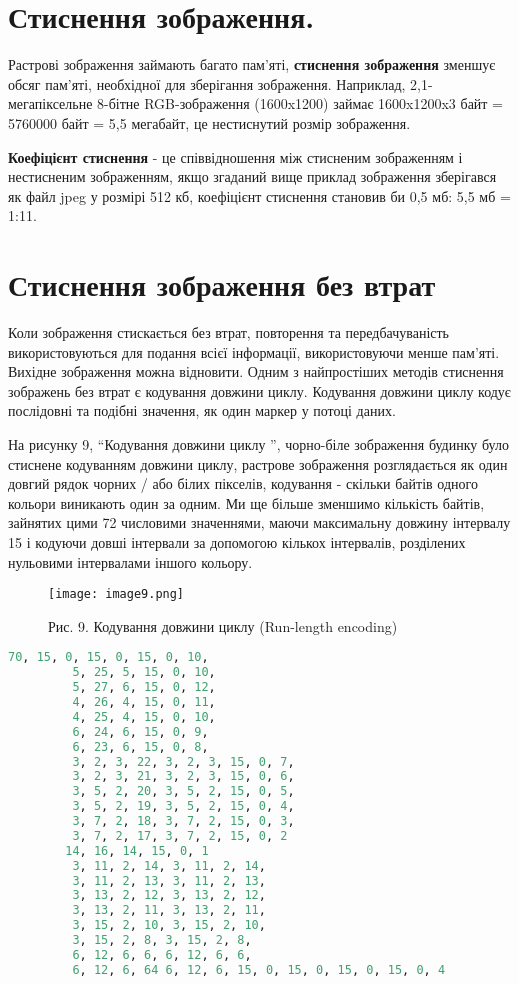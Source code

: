 \section{Стиснення зображення.}\label{sec:image_compression}
Растрові зображення займають багато пам'яті, \textbf{стиснення зображення} зменшує обсяг пам'яті, необхідної для зберігання зображення.
Наприклад, 2,1-мегапіксельне 8-бітне RGB-зображення (1600x1200) займає 1600x1200x3 байт = 5760000 байт = 5,5 мегабайт, це нестиснутий розмір зображення.

\textbf{Коефіцієнт стиснення} - це співвідношення між стисненим зображенням і нестисненим зображенням, якщо згаданий вище приклад зображення зберігався як файл jpeg у розмірі 512 кб, коефіцієнт стиснення становив би 0,5 мб: 5,5 мб = 1:11.


\section{Стиснення зображення без втрат}\label{sec:lossless_image_compression}
Коли зображення стискається без втрат, повторення та передбачуваність використовуються для подання всієї інформації, використовуючи менше пам'яті.
Вихідне зображення можна відновити.
Одним з найпростіших методів стиснення зображень без втрат є кодування довжини циклу.
Кодування довжини циклу кодує послідовні та подібні значення, як один маркер у потоці даних.

На рисунку 9, “Кодування довжини циклу ”, чорно-біле зображення будинку було стиснене кодуванням довжини циклу, растрове зображення розглядається як один довгий рядок чорних / або білих пікселів, кодування - скільки байтів одного кольори виникають один за одним.
Ми ще більше зменшимо кількість байтів, зайнятих цими 72 числовими значеннями, маючи максимальну довжину інтервалу 15 і кодуючи довші інтервали за допомогою кількох інтервалів, розділених нульовими інтервалами іншого кольору.
\begin{figure}
    \label{fig:image9}
    \centering
    \texttt{[image: image9.png]}

    Рис. 9. Кодування довжини циклу (Run-length encoding)
\end{figure}

\begin{lstlisting}[style=light, language=Python,label={lst:vectorimg},caption=Кодування довжини циклу]
        70, 15, 0, 15, 0, 15, 0, 10,
         5, 25, 5, 15, 0, 10,
         5, 27, 6, 15, 0, 12,
         4, 26, 4, 15, 0, 11,
         4, 25, 4, 15, 0, 10,
         6, 24, 6, 15, 0, 9,
         6, 23, 6, 15, 0, 8,
         3, 2, 3, 22, 3, 2, 3, 15, 0, 7,
         3, 2, 3, 21, 3, 2, 3, 15, 0, 6,
         3, 5, 2, 20, 3, 5, 2, 15, 0, 5,
         3, 5, 2, 19, 3, 5, 2, 15, 0, 4,
         3, 7, 2, 18, 3, 7, 2, 15, 0, 3,
         3, 7, 2, 17, 3, 7, 2, 15, 0, 2
        14, 16, 14, 15, 0, 1
         3, 11, 2, 14, 3, 11, 2, 14,
         3, 11, 2, 13, 3, 11, 2, 13,
         3, 13, 2, 12, 3, 13, 2, 12,
         3, 13, 2, 11, 3, 13, 2, 11,
         3, 15, 2, 10, 3, 15, 2, 10,
         3, 15, 2, 8, 3, 15, 2, 8,
         6, 12, 6, 6, 6, 12, 6, 6,
         6, 12, 6, 64 6, 12, 6, 15, 0, 15, 0, 15, 0, 15, 0, 4
\end{lstlisting}



